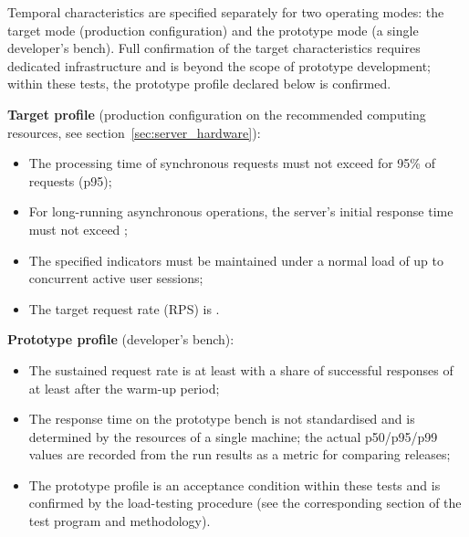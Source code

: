 \documentclass[12pt,a4paper]{extarticle}
\begin{document}
\begin{hseExample}
Temporal characteristics are specified separately for two operating modes: the target mode (production configuration) and the prototype mode (a single developer's bench). Full confirmation of the target characteristics requires dedicated infrastructure and is beyond the scope of prototype development; within these tests, the prototype profile declared below is confirmed.

\textbf{Target profile} (production configuration on the recommended computing resources, see section~\ref{sec:server_hardware}):
\begin{itemize}[leftmargin=1.25cm]
    \item The processing time of synchronous requests must not exceed  for 95\% of requests (p95);
    \item For long-running asynchronous operations, the server's initial response time must not exceed ;
    \item The specified indicators must be maintained under a normal load of up to~ concurrent active user sessions;
    \item The target request rate (RPS) is .
\end{itemize}

\textbf{Prototype profile} (developer's bench):
\begin{itemize}[leftmargin=1.25cm]
    \item The sustained request rate is at least  with a share of successful responses of at least  after the warm-up period;
    \item The response time on the prototype bench is not standardised and is determined by the resources of a single machine; the actual p50/p95/p99 values are recorded from the run results as a metric for comparing releases;
    \item The prototype profile is an acceptance condition within these tests and is confirmed by the load-testing procedure (see the corresponding section of the test program and methodology).
\end{itemize}
\end{hseExample}
\end{document}

